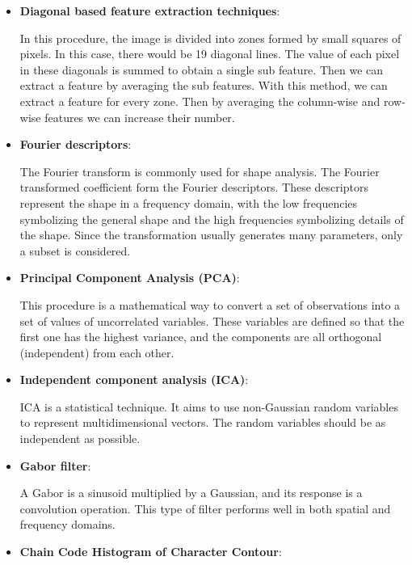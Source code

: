 \documentclass[conference]{IEEEtran}
\begin{document}
				\begin{itemize}
				
					\item \textbf{Diagonal based feature extraction techniques}:
					
						In this procedure, the image is divided into zones formed by small squares of pixels. 
						In this case, there would be 19 diagonal lines. 
						The value of each pixel in these diagonals is summed to obtain a single sub feature. 
						Then we can extract a feature by averaging the sub features. 
						With this method, we can extract a feature for every zone. 
						Then by averaging the column-wise and row-wise features we can increase their number. 
						
					
					\item \textbf{Fourier descriptors}:
					
						The Fourier transform is commonly used for shape analysis. 
						The Fourier transformed coefficient form the Fourier descriptors. 
						These descriptors represent the shape in a frequency domain, with the low frequencies symbolizing the general shape and the high frequencies symbolizing details of the shape. 
						Since the transformation usually generates many parameters, only a subset is considered.
					
					
					\item \textbf{Principal Component Analysis (PCA)}:
					
						This procedure is a mathematical way to convert a set of observations into a set of values of uncorrelated variables. 
						These variables are defined so that the first one has the highest variance, and the components are all orthogonal (independent) from each other. 
						
					\item \textbf{Independent component analysis (ICA)}:
					
						ICA is a statistical technique. 
						It aims to use non-Gaussian random variables to represent multidimensional vectors. 
						The random variables should be as independent as possible. 
					
					\item \textbf{Gabor filter}:
					
						A Gabor is a sinusoid multiplied by a Gaussian, and its response is a convolution operation. 
						This type of filter performs well in both spatial and frequency domains. 
					
					\item \textbf{Chain Code Histogram of Character Contour}:
					

\end{itemize}
\end{document}
